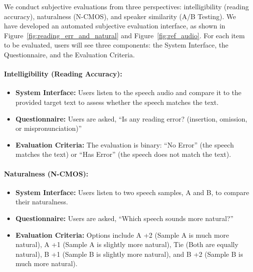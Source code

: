 \documentclass[11pt]{article}
\begin{document}
We conduct subjective evaluations from three perspectives: intelligibility (reading accuracy), naturalness (N-CMOS), and speaker similarity (A/B Testing). We have developed an automated subjective evaluation interface, as shown in Figure~\ref{fig:reading_err_and_natural} and Figure~\ref{fig:ref_audio}. For each item to be evaluated, users will see three components: the System Interface, the Questionnaire, and the Evaluation Criteria.

    \paragraph{Intelligibility (Reading Accuracy):}
    
    \begin{itemize}[itemsep=0ex,leftmargin=2ex]
        \item \textbf{System Interface:} Users listen to the speech audio and compare it to the provided target text to assess whether the speech matches the text.
        
        \item \textbf{Questionnaire:} Users are asked, ``Is any reading error? (insertion, omission, or mispronunciation)''

         \item \textbf{Evaluation Criteria:} The evaluation is binary: ``No Error'' (the speech matches the text) or ``Has Error'' (the speech does not match the text).
    \end{itemize}
    
    \paragraph{Naturalness (N-CMOS):}
    
    \begin{itemize}[itemsep=0ex,leftmargin=2ex]
        \item \textbf{System Interface:} Users listen to two speech samples, A and B, to compare their naturalness.
        
        \item \textbf{Questionnaire:} Users are asked, ``Which speech sounds more natural?''
        
        \item \textbf{Evaluation Criteria:} Options include A +2 (Sample A is much more natural), A +1 (Sample A is slightly more natural), Tie (Both are equally natural), B +1 (Sample B is slightly more natural), and B +2 (Sample B is much more natural).
    \end{itemize}
    
\end{document}
